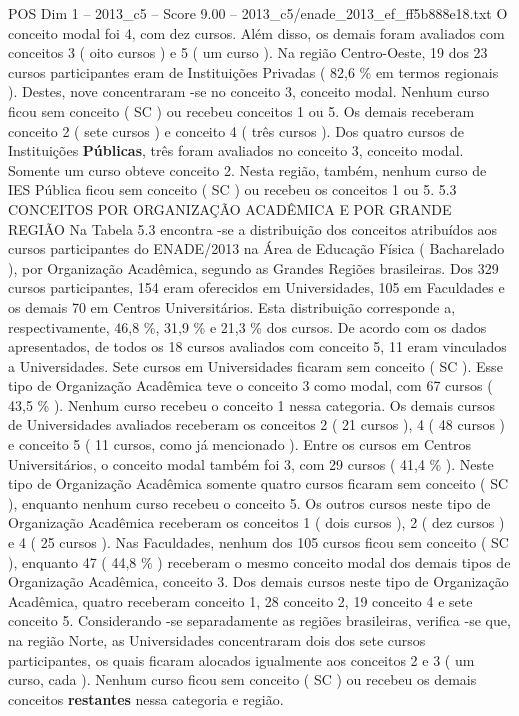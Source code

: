 \begin{textsample}{POS Dim 1 – 2013\_c5 – Score 9.00 – 2013\_c5/enade\_2013\_ef\_ff5b888e18.txt}
O conceito modal foi 4, com dez cursos.
Além disso, os demais foram avaliados com conceitos 3 ( oito cursos ) e 5 ( um curso ).
Na região Centro-Oeste, 19 dos 23 cursos participantes eram de Instituições Privadas ( 82,6 \% em termos regionais ).
Destes, nove concentraram -se no conceito 3, conceito modal.
Nenhum curso ficou sem conceito ( SC ) ou recebeu conceitos 1 ou 5.
Os demais receberam conceito 2 ( sete cursos ) e conceito 4 ( três cursos ).
Dos quatro cursos de Instituições \textbf{Públicas}, três foram avaliados no conceito 3, conceito modal.
Somente um curso obteve conceito 2.
Nesta região, também, nenhum curso de IES Pública ficou sem conceito ( SC ) ou recebeu os conceitos 1 ou 5. 5.3 CONCEITOS POR ORGANIZAÇÃO ACADÊMICA E POR GRANDE REGIÃO Na Tabela 5.3 encontra -se a distribuição dos conceitos atribuídos aos cursos participantes do ENADE/2013 na Área de Educação Física ( Bacharelado ), por Organização Acadêmica, segundo as Grandes Regiões brasileiras.
Dos 329 cursos participantes, 154 eram oferecidos em Universidades, 105 em Faculdades e os demais 70 em Centros Universitários.
Esta distribuição corresponde a, respectivamente, 46,8 \%, 31,9 \% e 21,3 \% dos cursos.
De acordo com os dados apresentados, de todos os 18 cursos avaliados com conceito 5, 11 eram vinculados a Universidades.
Sete cursos em Universidades ficaram sem conceito ( SC ).
Esse tipo de Organização Acadêmica teve o conceito 3 como modal, com 67 cursos ( 43,5 \% ).
Nenhum curso recebeu o conceito 1 nessa categoria.
Os demais cursos de Universidades avaliados receberam os conceitos 2 ( 21 cursos ), 4 ( 48 cursos ) e conceito 5 ( 11 cursos, como já mencionado ).
Entre os cursos em Centros Universitários, o conceito modal também foi 3, com 29 cursos ( 41,4 \% ).
Neste tipo de Organização Acadêmica somente quatro cursos ficaram sem conceito ( SC ), enquanto nenhum curso recebeu o conceito 5.
Os outros cursos neste tipo de Organização Acadêmica receberam os conceitos 1 ( dois cursos ), 2 ( dez cursos ) e 4 ( 25 cursos ).
Nas Faculdades, nenhum dos 105 cursos ficou sem conceito ( SC ), enquanto 47 ( 44,8 \% ) receberam o mesmo conceito modal dos demais tipos de Organização Acadêmica, conceito 3.
Dos demais cursos neste tipo de Organização Acadêmica, quatro receberam conceito 1, 28 conceito 2, 19 conceito 4 e sete conceito 5.
Considerando -se separadamente as regiões brasileiras, verifica -se que, na região Norte, as Universidades concentraram dois dos sete cursos participantes, os quais ficaram alocados igualmente aos conceitos 2 e 3 ( um curso, cada ).
Nenhum curso ficou sem conceito ( SC ) ou recebeu os demais conceitos \textbf{restantes} nessa categoria e região.

\end{textsample}
